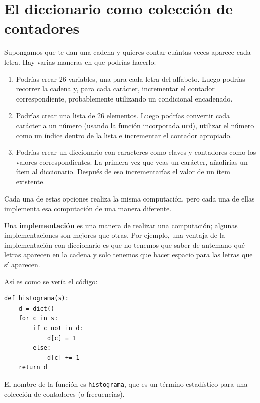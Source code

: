 \documentclass[10pt]{book}
\begin{document}
\section{El diccionario como colección de contadores}
\label{histogram}

Supongamos que te dan una cadena y quieres contar cuántas
veces aparece cada letra.  Hay varias maneras en que podrías hacerlo:

\begin{enumerate}

\item Podrías crear 26 variables, una para cada letra del
alfabeto.  Luego podrías recorrer la cadena y, para cada
carácter, incrementar el contador correspondiente, probablemente utilizando
un condicional encadenado.

\item Podrías crear una lista de 26 elementos.  Luego podrías
convertir cada carácter a un número (usando la función incorporada
{\tt ord}), utilizar el número como un índice dentro de la lista e incrementar
el contador apropiado.

\item Podrías crear un diccionario con caracteres como claves
y contadores como los valores correspondientes.  La primera vez que
veas un carácter, añadirías un ítem al diccionario.  Después
de eso incrementarías el valor de un ítem existente.

\end{enumerate}

Cada una de estas opciones realiza la misma computación, pero cada una
de ellas implementa esa computación de una manera diferente.

Una {\bf implementación} es una manera de realizar una computación;
algunas implementaciones son mejores que otras.  Por ejemplo,
una ventaja de la implementación con diccionario es que no
tenemos que saber de antemano qué letras aparecen en la cadena
y solo tenemos que hacer espacio para las letras que sí aparecen.

Así es como se vería el código:

\begin{verbatim}
def histograma(s):
    d = dict()
    for c in s:
        if c not in d:
            d[c] = 1
        else:
            d[c] += 1
    return d
\end{verbatim}
%
El nombre de la función es {\tt histograma}, que es un término
estadístico para una colección de contadores (o frecuencias).
\end{document}
